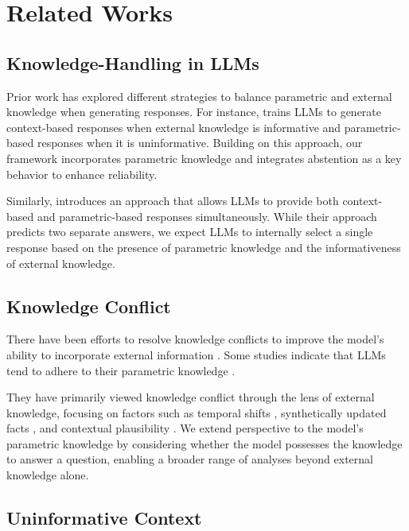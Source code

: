 \section{Related Works}

\subsection{Knowledge-Handling in LLMs}

Prior work has explored different strategies to balance parametric and external knowledge when generating responses. 
For instance, \citet{li-etal-2023-large} trains LLMs to generate context-based responses when external knowledge is informative and parametric-based responses when it is uninformative.
Building on this approach, our framework incorporates parametric knowledge and integrates abstention as a key behavior to enhance reliability.


Similarly, \citet{neeman-etal-2023-disentqa} introduces an approach that allows LLMs to provide both context-based and parametric-based responses simultaneously. 
While their approach predicts two separate answers, we expect LLMs to internally select a single response based on the presence of parametric knowledge and the informativeness of external knowledge.


\subsection{Knowledge Conflict}

There have been efforts to resolve knowledge conflicts to improve the model's ability to incorporate external information \citep{zhou-etal-2023-context, park2024toward, shi-etal-2024-trusting}.
Some studies indicate that LLMs tend to adhere to their parametric knowledge \citep{longpre-etal-2021-entity, jin-etal-2024-tug}. 


They have primarily viewed knowledge conflict through the lens of external knowledge, focusing on factors such as temporal shifts \citep{NEURIPS2023_9941624e, dhingra-etal-2022-time}, synthetically updated facts \citep{longpre-etal-2021-entity}, and contextual plausibility \citep{xie2023adaptive, tan-etal-2024-blinded}.
We extend perspective to the model's parametric knowledge by considering whether the model possesses the knowledge to answer a question, enabling a broader range of analyses beyond external knowledge alone. 



\subsection{Uninformative Context}

